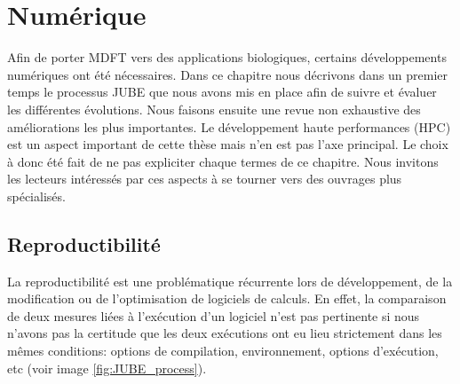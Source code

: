 \chapter{Numérique}
\label{chap:numerique}



Afin de porter MDFT vers des applications biologiques, certains développements numériques ont été nécessaires. Dans ce chapitre nous décrivons dans un premier temps le processus JUBE que nous avons mis en place afin de suivre et évaluer les différentes évolutions. Nous faisons ensuite une revue non exhaustive des améliorations les plus importantes. Le développement haute performances (HPC) est un aspect important de cette thèse mais n'en est pas l'axe principal. Le choix à donc été fait de ne pas expliciter chaque termes de ce chapitre. Nous invitons les lecteurs intéressés par ces aspects à se tourner vers des ouvrages plus spécialisés.


\section{Reproductibilité}
La reproductibilité est une problématique récurrente lors de développement, de la modification ou de l'optimisation de logiciels de calculs. En effet, la comparaison de deux mesures liées à l’exécution d'un logiciel n'est pas pertinente si nous n'avons pas la certitude que les deux exécutions ont eu lieu strictement dans les mêmes conditions: options de compilation, environnement, options d’exécution, etc (voir image \ref{fig:JUBE_process}).

